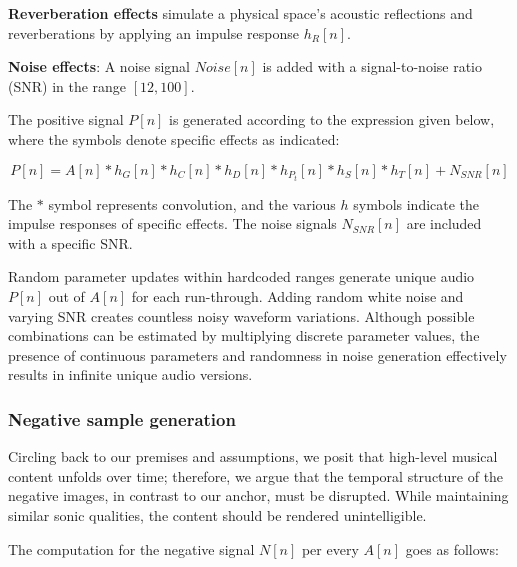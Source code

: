 \textbf{Reverberation effects} simulate a physical space's acoustic reflections and reverberations by applying an impulse response $h_R[n]$.

\textbf{Noise effects}: A noise signal $Noise[n]$ is added with a signal-to-noise ratio (SNR) in the range $[12, 100]$.

The positive signal $P[n]$ is generated according to the expression given below, where the symbols denote specific effects as indicated:

\begin{equation}\label{eq:positive_signal}
P[n] = A[n] \ast h_{G}[n] \ast h_{C}[n] \ast h_{D}[n] \ast h_{P_t}[n] \ast h_{S}[n] \ast h_{T}[n] + N_{SNR}[n]
\end{equation}

The $\ast$ symbol represents convolution, and the various $h$ symbols indicate the impulse responses of specific effects. The noise signals $N_{SNR}[n]$ are included with a specific SNR.

Random parameter updates within hardcoded ranges generate unique audio $P[n]$ out of $A[n]$ for each run-through. Adding random white noise and varying SNR creates countless noisy waveform variations. Although possible combinations can be estimated by multiplying discrete parameter values, the presence of continuous parameters and randomness in noise generation effectively results in infinite unique audio versions.

\subsubsection{Negative sample generation}

Circling back to our premises and assumptions, we posit that high-level musical content unfolds over time; therefore, we argue that the temporal structure of the negative images, in contrast to our anchor, must be disrupted. While maintaining similar sonic qualities, the content should be rendered unintelligible.

The computation for the negative signal $N[n]$ per every $A[n]$ goes as follows:

